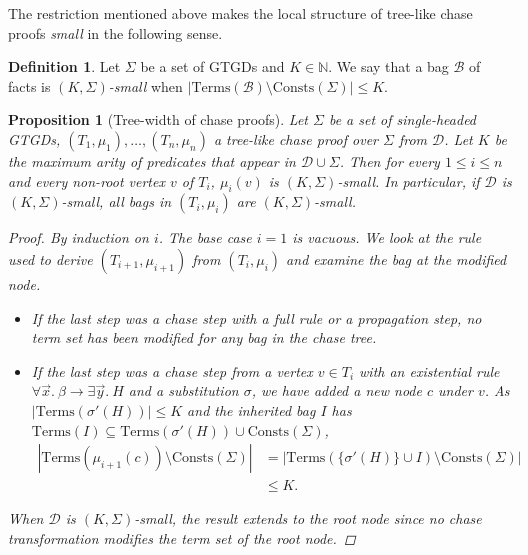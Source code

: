 \documentclass[12pt]{report}
\theoremstyle{plain}
\newtheorem{proposition}[theorem]{Proposition}
\theoremstyle{definition}
\newtheorem{definition}[theorem]{Definition}
\def\Consts{{\mathrm{Consts}}}
\def\Terms{{\mathrm{Terms}}}
\begin{document}
The restriction mentioned above makes the local structure of tree-like chase proofs \emph{small} in the following sense.

\begin{definition}
  Let $\Sigma$ be a set of GTGDs and $K \in \mathbb{N}$. We say that a bag $\mathcal{B}$ of facts is \emph{$(K, \Sigma)$-small} when $|\Terms(\mathcal{B}) \setminus \Consts(\Sigma)| \leq K$.
\end{definition}

\begin{proposition}[Tree-width of chase proofs]
\label{chase-proofs-tree-width}
  Let $\Sigma$ be a set of \emph{single-headed} GTGDs, $(T_1, \mu_1), \ldots, (T_n, \mu_n)$ a tree-like chase proof over $\Sigma$ from $\mathcal{D}$. Let $K$ be the maximum arity of predicates that appear in $\mathcal{D} \cup \Sigma$. Then for every $1 \leq i \leq n$ and every non-root vertex $v$ of $T_i$, $\mu_i(v)$ is $(K, \Sigma)$-small. In particular, if $\mathcal{D}$ is $(K, \Sigma)$-small, all bags in $(T_i, \mu_i)$ are $(K, \Sigma)$-small.
  \begin{proof}
    By induction on $i$. The base case $i = 1$ is vacuous. We look at the rule used to derive $(T_{i+1}, \mu_{i+1})$ from $(T_{i}, \mu_{i})$ and examine the bag at the modified node.
    \begin{itemize}
      \item If the last step was a chase step with a full rule or a propagation step, no term set has been modified for any bag in the chase tree.
      \item If the last step was a chase step from a vertex $v \in T_i$ with an existential rule $\forall \vec{x}.\ \beta \rightarrow \exists \vec{y}.\ H$ and a substitution $\sigma$, we have added a new node $c$ under $v$. As $|\Terms(\sigma'(H))| \leq K$ and the inherited bag $I$ has $\Terms(I) \subseteq \Terms(\sigma'(H)) \cup \Consts(\Sigma)$,
      \begin{equation*}
        \begin{split}
          |\Terms(\mu_{i+1}(c)) \setminus \Consts(\Sigma)|
            &= |\Terms(\{\sigma'(H)\} \cup I) \setminus \Consts(\Sigma)| \\
            &\leq K.
        \end{split}
      \end{equation*}
    \end{itemize}
    When $\mathcal{D}$ is $(K, \Sigma)$-small, the result extends to the root node since no chase transformation modifies the term set of the root node.
  \end{proof}
\end{proposition}
\end{document}
